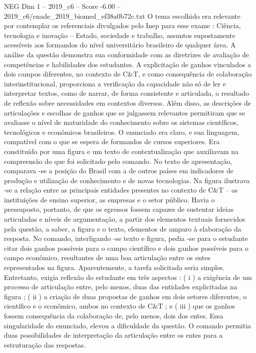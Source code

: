 \begin{textsample}{NEG Dim 1 – 2019\_c6 – Score -6.00 – 2019\_c6/enade\_2019\_biomed\_ef38a0b72c.txt}
O tema escolhido era relevante por contemplar os referenciais divulgados pelo Inep para esse exame : Ciência, tecnologia e inovação – Estado, sociedade e trabalho, assuntos supostamente acessíveis aos formandos do nível universitário brasileiro de qualquer área.
A análise da questão demonstra sua conformidade com as diretrizes de avaliação de competências e habilidades dos estudantes.
A explicitação de ganhos vinculados a dois campos diferentes, no contexto de C\&T, e como consequência de colaboração interinstitucional, proporciona a verificação da capacidade não só de ler e interpretar textos, como de narrar, de forma consistente e articulada, o resultado de reflexão sobre necessidades em contextos diversos.
Além disso, as descrições de articulações e escolhas de ganhos que se julgassem relevantes permitiram que se avaliasse o nível de maturidade do conhecimento sobre os sistemas científicos, tecnológicos e econômicos brasileiros.
O enunciado era claro, e sua linguagem, compatível com o que se espera de formandos de cursos superiores.
Era constituído por uma figura e um texto de contextualização que auxiliavam na compreensão do que foi solicitado pelo comando.
No texto de apresentação, comparava -se a posição do Brasil com a de outros países em indicadores de produção e utilização de conhecimento e de novas tecnologias.
Na figura ilustrava -se a relação entre as principais entidades presentes no contexto de C\&T – as instituições de ensino superior, as empresas e o setor público.
Havia o pressuposto, portanto, de que os egressos fossem capazes de sustentar ideias articuladas e níveis de argumentação, a partir dos elementos textuais fornecidos pela questão, a saber, a figura e o texto, elementos de amparo à elaboração da resposta.
No comando, interligando -se texto e figura, pedia -se para o estudante citar dois ganhos possíveis para o campo científico e dois ganhos possíveis para o campo econômico, resultantes de uma boa articulação entre os entes representados na figura.
Aparentemente, a tarefa solicitada seria simples.
Entretanto, exigia reflexão do estudante em três aspectos : ( i ) a exigência de um processo de articulação entre, pelo menos, duas das entidades explicitadas na figura ; ( ii ) a criação de duas propostas de ganhos em dois setores diferentes, o científico e o econômico, ambos no contexto de C\&T ; e ( iii ) que os ganhos fossem consequência da colaboração de, pelo menos, dois dos entes.
Essa singularidade do enunciado, elevou a dificuldade da questão.
O comando permitia duas possibilidades de interpretação da articulação entre os entes para a estruturação das respostas.

\end{textsample}
